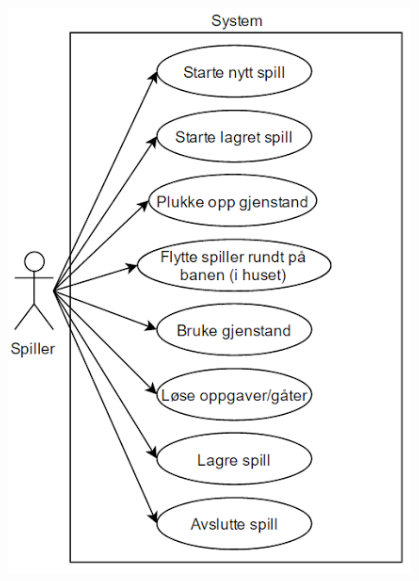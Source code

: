 \documentclass[12pt]{report}
\begin{document}
\includegraphics[width=0.8\textwidth,natwidth=500,natheight=642]{use_case_diagram_s.png}
\end{document}
